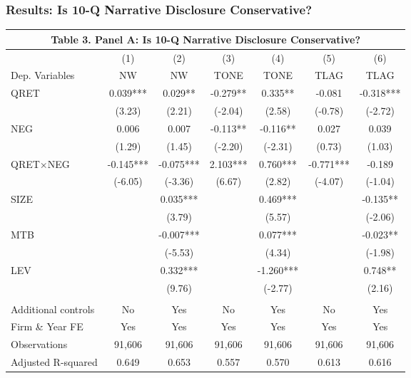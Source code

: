 \documentclass{beamer}
\begin{document}
\begin{frame}
\frametitle{Results: Is 10-Q Narrative Disclosure Conservative?}

\begin{table}[H] \label{T3PA}
	\begin{center} \tiny
		\begin{tabular}{lcccccc}
			\multicolumn{7}{c}{\textbf{Table 3. Panel A: Is 10-Q Narrative Disclosure Conservative?}} \\
			\toprule
			\toprule
			& (1) & (2) & (3) & (4) & (5) & (6) \\
			Dep. Variables & NW & NW & TONE & TONE & TLAG & TLAG \\
			\midrule

			QRET & 0.039*** & 0.029** & -0.279** & 0.335** & -0.081 & -0.318*** \\
			& (3.23) & (2.21) & (-2.04) & (2.58) & (-0.78) & (-2.72) \\
			NEG & 0.006 & 0.007 & -0.113** & -0.116** & 0.027 & 0.039 \\
			& (1.29) & (1.45) & (-2.20) & (-2.31) & (0.73) & (1.03) \\
			QRET$\times$NEG & -0.145*** & -0.075*** & 2.103*** & 0.760*** & -0.771*** & -0.189 \\
			 & (-6.05) & (-3.36) & (6.67) & (2.82) & (-4.07) & (-1.04) \\
			SIZE &   & 0.035*** &   & 0.469*** &   & -0.135** \\
			&   & (3.79) &   & (5.57) &   & (-2.06) \\
			MTB &   & -0.007*** &   & 0.077*** &   & -0.023** \\
			&   & (-5.53) &   & (4.34) &   & (-1.98) \\
			LEV &   & 0.332*** &   & -1.260*** &   & 0.748** \\
			&   & (9.76) &   & (-2.77) &   & (2.16) \\



			&   &   &   &   &   &  \\
			Additional controls & No & Yes & No & Yes & No & Yes \\
			Firm \& Year FE & Yes & Yes & Yes & Yes & Yes & Yes  \\
			Observations & 91,606 & 91,606 & 91,606 & 91,606 & 91,606 & 91,606 \\
			Adjusted R-squared & 0.649 & 0.653 & 0.557 & 0.570 & 0.613 & 0.616 \\
			\bottomrule
			\bottomrule
		\end{tabular}%
	\end{center}

\end{table}%

\end{frame}
\end{document}
